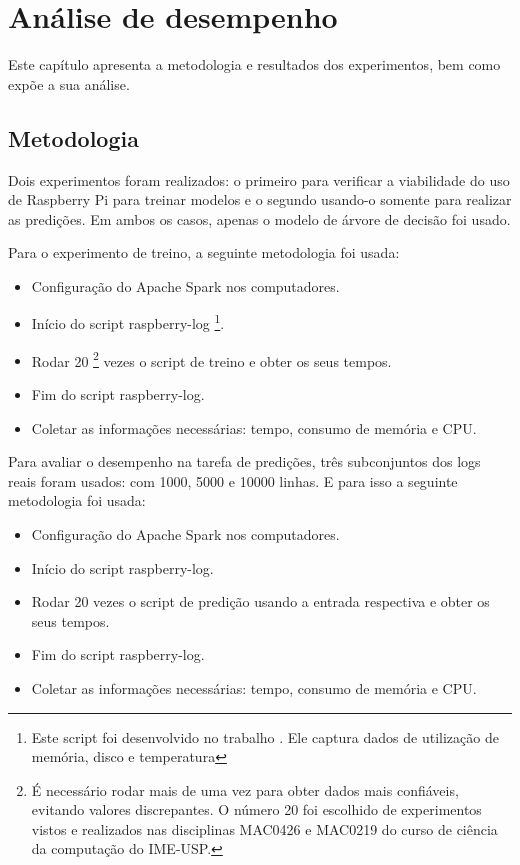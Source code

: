 
\chapter{Análise de desempenho}
\label{cap:results}

Este capítulo apresenta a metodologia e resultados dos experimentos, bem como 
expõe a sua análise.

\section{Metodologia}

Dois experimentos foram realizados: o primeiro para verificar a viabilidade do uso 
de Raspberry Pi para treinar modelos e o segundo usando-o somente para realizar as
predições. Em ambos os casos, apenas o modelo de árvore de decisão foi usado.

Para o experimento de treino, a seguinte metodologia foi usada:

\begin{itemize}
    \item Configuração do Apache Spark nos computadores.
    \item Início do script raspberry-log 
    \footnote{Este script foi desenvolvido no trabalho \cite{tcc:lucas}. Ele captura dados
    de utilização de memória, disco e temperatura}. 
    \item Rodar 20 \footnote{É necessário rodar mais de uma vez para obter dados mais 
    confiáveis, evitando valores discrepantes. O número 20 foi escolhido de experimentos 
    vistos e realizados nas disciplinas MAC0426 e MAC0219 do curso de ciência da computação do IME-USP.} 
    vezes o script de treino e obter os seus tempos.
    \item Fim do script raspberry-log. 
    \item Coletar as informações necessárias: tempo, consumo de memória e CPU.
\end{itemize}

Para avaliar o desempenho na tarefa de predições, três subconjuntos
dos logs reais foram usados: com 1000, 5000 e 10000 linhas. E para isso a seguinte 
metodologia foi usada: 

\begin{itemize}
    \item Configuração do Apache Spark nos computadores.
    \item Início do script raspberry-log. 
    \item Rodar 20 vezes o script de predição usando a entrada respectiva e obter os seus tempos.
    \item Fim do script raspberry-log. 
    \item Coletar as informações necessárias: tempo, consumo de memória e CPU.
\end{itemize}

